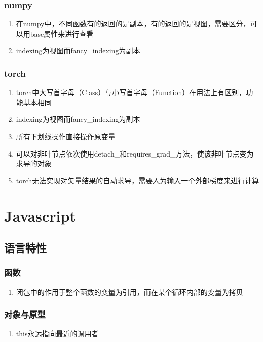 \documentclass[onecolumn]{article}
\begin{document}
        \subsubsection{numpy}
            \noindent
            \begin{enumerate}
                \item 在numpy中，不同函数有的返回的是副本，有的返回的是视图，需要区分，可以用base属性来进行查看
                \item indexing为视图而fancy\_indexing为副本
            \end{enumerate}
        \subsubsection{torch}
            \noindent
            \begin{enumerate}
                \item torch中大写首字母（Class）与小写首字母（Function）在用法上有区别，功能基本相同
                \item indexing为视图而fancy\_indexing为副本
                \item 所有下划线操作直接操作原变量
                \item 可以对非叶节点依次使用detach\_和requires\_grad\_方法，使该非叶节点变为求导的对象
                \item torch无法实现对矢量结果的自动求导，需要人为输入一个外部梯度来进行计算
            \end{enumerate}
\newpage
\section{Javascript}
    \subsection{语言特性}
        \subsubsection{函数}
            \noindent
            \begin{enumerate}
                \item 闭包中的作用于整个函数的变量为引用，而在某个循环内部的变量为拷贝
            \end{enumerate}
        \subsubsection{对象与原型}
            \noindent
            \begin{enumerate}
                \item this永远指向最近的调用者
            \end{enumerate}
\newpage
\end{document}
